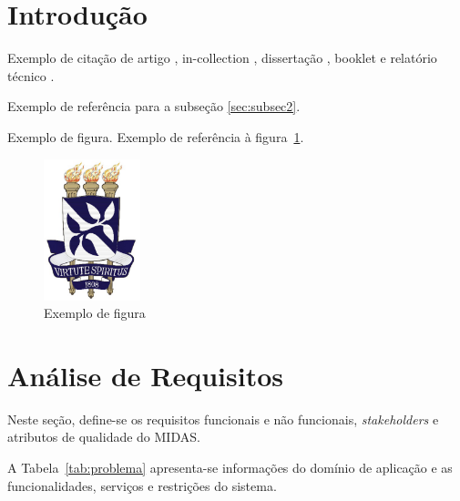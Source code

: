 \documentclass[11pt,a4paper]{article}
\begin{document}


\section{Introdução}



Exemplo de citação de artigo \cite{article-full}, in-collection \cite{incollection-full},  dissertação \cite{mastersthesis-full}, booklet \cite{booklet-full}  e relatório técnico \cite{techreport-full}.

Exemplo de referência para a subseção \ref{sec:subsec2}.

Exemplo de figura. Exemplo de referência à figura~\ref{fig:logo}.

\begin{figure}[htb]
\centering
   \includegraphics[width=0.25\textwidth]{LogoUFBA.eps}
\caption{Exemplo de figura}  \label{fig:logo}
\end{figure}

\newpage
\section{Análise de Requisitos}

Neste seção, define-se os requisitos funcionais e não funcionais, \textit{stakeholders} e atributos de qualidade do MIDAS. 

A Tabela~\ref{tab:problema} apresenta-se informações do domínio de aplicação e as funcionalidades, serviços e restrições do sistema.  
\end{document}
